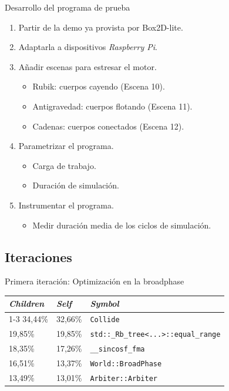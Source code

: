 \documentclass[10pt,xcolor=table]{beamer}
\begin{document}
\begin{frame}{Desarrollo del programa de prueba}
  \begin{enumerate}
    \item Partir de la demo ya provista por Box2D-lite.
    \item Adaptarla a dispositivos \textit{Raspberry Pi}.
    \item Añadir escenas para estresar el motor.
    \begin{itemize}
      \item Rubik: cuerpos cayendo (Escena 10).
      \item Antigravedad: cuerpos flotando (Escena 11).
      \item Cadenas: cuerpos conectados (Escena 12).
    \end{itemize}
    \item Parametrizar el programa.
    \begin{itemize}
      \item Carga de trabajo.
      \item Duración de simulación.
    \end{itemize}
    \item Instrumentar el programa.
    \begin{itemize}
      \item Medir duración media de los ciclos de simulación.
    \end{itemize}
  \end{enumerate}
\end{frame}

\subsection{Iteraciones}

\begin{frame}{Primera iteración: Optimización en la broadphase}
  \begin{table}[]
  \begin{tabular}{lll}
  \textbf{\textit{Children}} & \textbf{\textit{Self}} & \textbf{\textit{Symbol}} \\ \cline{1-3}
  \rowcolor{rojosuave}
  34,44\% & 32,66\% & \texttt{Collide} \\ \hline
  \rowcolor{rojosuave}
  19,85\% & 19,85\% & \texttt{std::\_Rb\_tree\textless{}...\textgreater{}::equal\_range} \\ \hline
  18,35\% & 17,26\% & \texttt{\_\_sincosf\_fma} \\ \hline
  16,51\% & 13,37\% & \texttt{World::BroadPhase} \\ \hline
  13,49\% & 13,01\% & \texttt{Arbiter::Arbiter} \\ \hline
  \end{tabular}
  \end{table}
\end{frame}
\end{document}
